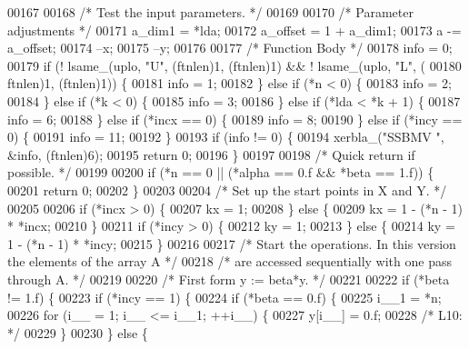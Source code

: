 \begin{DoxyCode}
00167 
00168 \textcolor{comment}{/*     Test the input parameters. */}
00169 
00170     \textcolor{comment}{/* Parameter adjustments */}
00171     a\_dim1 = *lda;
00172     a\_offset = 1 + a\_dim1;
00173     a -= a\_offset;
00174     --x;
00175     --y;
00176 
00177     \textcolor{comment}{/* Function Body */}
00178     info = 0;
00179     \textcolor{keywordflow}{if} (! lsame\_(uplo, \textcolor{stringliteral}{"U"}, (ftnlen)1, (ftnlen)1) && ! lsame\_(uplo, \textcolor{stringliteral}{"L"}, (
00180         ftnlen)1, (ftnlen)1)) \{
00181     info = 1;
00182     \} \textcolor{keywordflow}{else} \textcolor{keywordflow}{if} (*n < 0) \{
00183     info = 2;
00184     \} \textcolor{keywordflow}{else} \textcolor{keywordflow}{if} (*k < 0) \{
00185     info = 3;
00186     \} \textcolor{keywordflow}{else} \textcolor{keywordflow}{if} (*lda < *k + 1) \{
00187     info = 6;
00188     \} \textcolor{keywordflow}{else} \textcolor{keywordflow}{if} (*incx == 0) \{
00189     info = 8;
00190     \} \textcolor{keywordflow}{else} \textcolor{keywordflow}{if} (*incy == 0) \{
00191     info = 11;
00192     \}
00193     \textcolor{keywordflow}{if} (info != 0) \{
00194     xerbla\_(\textcolor{stringliteral}{"SSBMV "}, &info, (ftnlen)6);
00195     \textcolor{keywordflow}{return} 0;
00196     \}
00197 
00198 \textcolor{comment}{/*     Quick return if possible. */}
00199 
00200     \textcolor{keywordflow}{if} (*n == 0 || (*alpha == 0.f && *beta == 1.f)) \{
00201     \textcolor{keywordflow}{return} 0;
00202     \}
00203 
00204 \textcolor{comment}{/*     Set up the start points in  X  and  Y. */}
00205 
00206     \textcolor{keywordflow}{if} (*incx > 0) \{
00207     kx = 1;
00208     \} \textcolor{keywordflow}{else} \{
00209     kx = 1 - (*n - 1) * *incx;
00210     \}
00211     \textcolor{keywordflow}{if} (*incy > 0) \{
00212     ky = 1;
00213     \} \textcolor{keywordflow}{else} \{
00214     ky = 1 - (*n - 1) * *incy;
00215     \}
00216 
00217 \textcolor{comment}{/*     Start the operations. In this version the elements of the array A */}
00218 \textcolor{comment}{/*     are accessed sequentially with one pass through A. */}
00219 
00220 \textcolor{comment}{/*     First form  y := beta*y. */}
00221 
00222     \textcolor{keywordflow}{if} (*beta != 1.f) \{
00223     \textcolor{keywordflow}{if} (*incy == 1) \{
00224         \textcolor{keywordflow}{if} (*beta == 0.f) \{
00225         i\_\_1 = *n;
00226         \textcolor{keywordflow}{for} (i\_\_ = 1; i\_\_ <= i\_\_1; ++i\_\_) \{
00227             y[i\_\_] = 0.f;
00228 \textcolor{comment}{/* L10: */}
00229         \}
00230         \} \textcolor{keywordflow}{else} \{

\end{DoxyCode}
